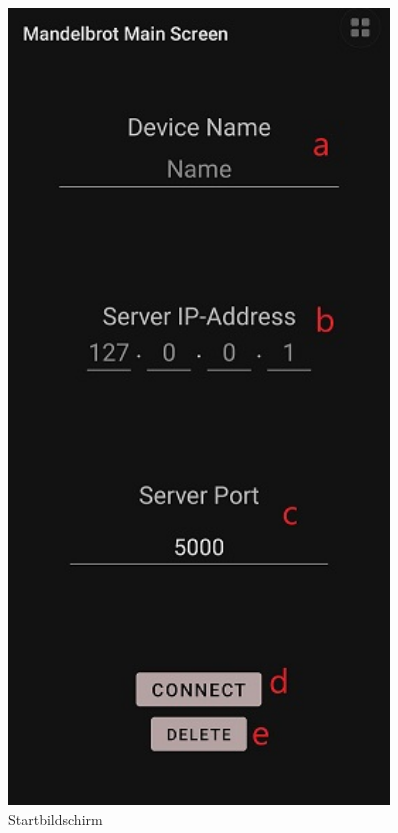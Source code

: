 \documentclass[12pt, onecolumn, notitlepage]{scrartcl}
\begin{document}
\begin{figure}[H] 
	\begin{minipage}[b]{.4\linewidth}
		\centering
		\includegraphics[height=0.5\textheight, width=0.9\textwidth]{start_screen.jpg}
		\caption{Startbildschirm}
	\end{minipage}
	\hspace{.1\linewidth}
	\begin{minipage}[b]{.4\linewidth}

\end{minipage}
\end{figure}
\end{document}
